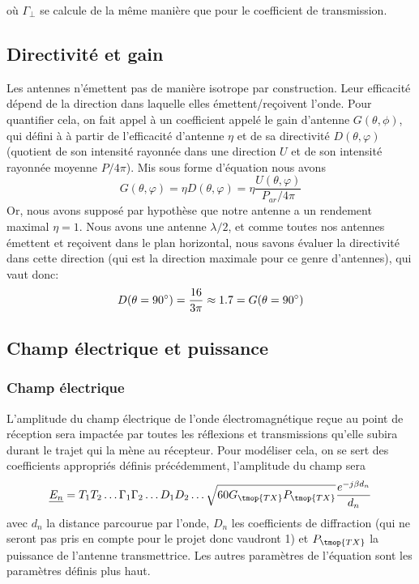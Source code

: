 o{\`u} $\Gamma_{\perp}$ se calcule de la m{\^e}me mani{\`e}re que pour le
coefficient de transmission.

\subsection{Directivit{\'e} et gain}

Les antennes n'{\'e}mettent pas de mani{\`e}re isotrope par construction. Leur
efficacit{\'e} d{\'e}pend de la direction dans laquelle elles
{\'e}mettent/re{\c c}oivent l'onde. Pour quantifier cela, on fait appel {\`a}
un coefficient appel{\'e} le gain d'antenne $G (\theta, \phi)$, qui défini à
{\`a} partir de l'efficacité d'antenne $\eta$ et de sa directivit{\'e} $D (\theta, \varphi)$ (quotient de son intensit{\'e} rayonn{\'e}e
dans une direction $U$ et de son intensit{\'e} rayonn{\'e}e moyenne $P / 4
\pi$). Mis sous forme d'{\'e}quation nous avons
\[ G (\theta, \varphi) = \eta D (\theta, \varphi) = \eta \frac{U (\theta,
   \varphi)}{P_{a r} / 4 \pi} \]
Or, nous avons suppos{\'e} par hypoth{\`e}se que notre antenne a un rendement
maximal $\eta = 1$. Nous avons une antenne $\lambda / 2$, et comme toutes nos
antennes {\'e}mettent et re{\c c}oivent dans le plan horizontal, nous savons
{\'e}valuer la directivit{\'e} dans cette direction (qui est la direction
maximale pour ce genre d'antennes), qui vaut donc:
\[ D (\theta = 90\degree) = \frac{16}{3 \pi} \approx 1.7 = G
   (\theta = 90\degree )\]
   
\subsection{Champ {\'e}lectrique et puissance }

\subsubsection*{Champ électrique}
L'amplitude du champ {\'e}lectrique de l'onde {\'e}lectromagn{\'e}tique re{\c
c}ue au point de r{\'e}ception sera impact{\'e}e par toutes les r{\'e}flexions
et transmissions qu'elle subira durant le trajet qui la m{\`e}ne au
r{\'e}cepteur. Pour mod{\'e}liser cela, on se sert des coefficients
appropri{\'e}s d{\'e}finis pr{\'e}c{\'e}demment, l'amplitude du champ sera
\begin{equation}
\label{eq:elec-field}
    \underline{E_n} = T_1 T_2 \ldots \Gamma_1 \Gamma_2 \ldots D_1 D_2 \ldots \sqrt{60 G_{\tmop{TX}} P_{\tmop{TX}}} \frac{e^{- j \beta d_n}}{d_n}
\end{equation}
avec $d_n$ la distance parcourue par l'onde, $D_n$ les coefficients de
diffraction (qui ne seront pas pris en compte pour le projet donc vaudront 1)
et $P_{\tmop{TX}}$ la puissance de l'antenne transmettrice. Les autres param{\`e}tres de
l'{\'e}quation sont les param{\`e}tres d{\'e}finis plus haut.

